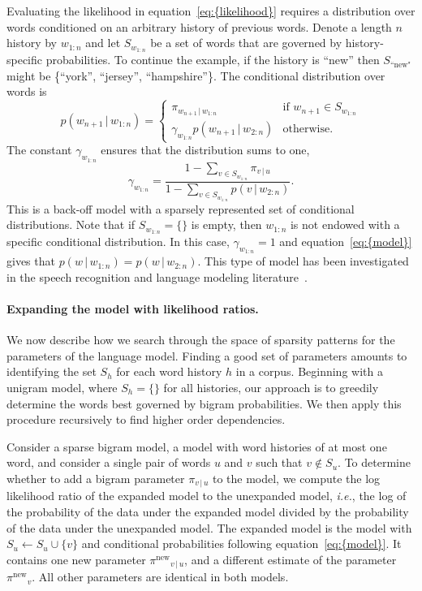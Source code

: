 \documentclass[11pt]{article}
\begin{document}
Evaluating the likelihood in {equation~\eqref{eq:{likelihood}}} requires a distribution
over words conditioned on an arbitrary history of previous words.
Denote a length $n$ history by $w_{1:n}$ and let $S_{w_{1:n}}$ be a
set of words that are governed by history-specific probabilities.  To
continue the example, if the history is ``new'' then
$S_{\textrm{``new"}}$ might be \{``york'', ``jersey'',
``hampshire''\}.  The conditional distribution over words is
\begin{equation}
  \label{eq:model}
  p(w_{n+1} {\,|\,} w_{1:n}) =
\begin{cases}
  \pi_{w_{n+1} {\,|\,} w_{1:n}} & \textrm{if $w_{n+1} \in S_{w_{1:n}}$} \\
  \gamma_{w_{1:n}} p(w_{n+1} {\,|\,} w_{2:n}) & \textrm{otherwise.}
\end{cases}
\end{equation}
The constant $\gamma_{w_{1:n}}$ ensures that the distribution sums to
one,
\begin{equation}
  \label{eq:scaling}
  \gamma_{w_{1:n}} = \frac{1 - \textstyle \sum_{v \in S_{w_{1:n}}} \pi_{v {\,|\,} u}}
  {1 - \sum_{v \in S_{w_{1:n}}} p(v {\,|\,} w_{2:n})}.
\end{equation}
This is a back-off model with a sparsely represented set of
conditional distributions.  Note that if $S_{w_{1:n}} = \{\}$ is
empty, then $w_{1:n}$ is not endowed with a specific conditional
distribution.  In this case, $\gamma_{w_{1:n}} = 1$ and {equation~\eqref{eq:{model}}}
gives that $p(w {\,|\,} w_{1:n}) = p(w {\,|\,} w_{2:n})$.  This type of model
has been investigated in the speech recognition and language modeling
literature~\cite{Katz:1987,Seymore:1996,Stolcke:1998}.

\paragraph{Expanding the model with likelihood ratios.}  We now
describe how we search through the space of sparsity patterns for the
parameters of the language model.  Finding a good set of parameters
amounts to identifying the set $S_{h}$ for each word history ${h}$
in a corpus.  Beginning with a unigram model, where $S_{h} = \{\}$
for all histories, our approach is to greedily determine the words
best governed by bigram probabilities.  We then apply this procedure
recursively to find higher order dependencies.

Consider a sparse bigram model, a model with word histories of at most
one word, and consider a single pair of words $u$ and $v$ such that $v
\notin S_u$.  To determine whether to add a bigram parameter $\pi_{v
  {\,|\,} u}$ to the model, we compute the log likelihood ratio of the
expanded model to the unexpanded model, {\textit{i.e.}}, the log of the
probability of the data under the expanded model divided by the
probability of the data under the unexpanded model.  The expanded
model is the model with $S_u \leftarrow S_u \cup \{v\}$ and
conditional probabilities following {equation~\eqref{eq:{model}}}. It contains one new
parameter ${\pi^{\textrm{new}}}_{v {\,|\,} u}$, and a different estimate of the parameter
${\pi^{\textrm{new}}}_v$.  All other parameters are identical in both models.
\end{document}
